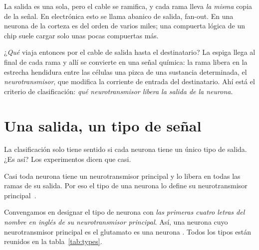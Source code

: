 La salida es una sola, pero el cable se ramifica, y cada rama lleva \emph{la misma} copia de la señal. En electrónica esto se llama abanico de salida, fan-out. En una neurona de la corteza es del orden de varios miles; una compuerta lógica de un chip suele cargar solo unas pocas compuertas más.

¿\emph{Qué} viaja entonces por el cable de salida hasta el destinatario? La espiga llega al final de cada rama y allí se convierte en una señal química: la rama libera en la estrecha hendidura entre las células una pizca de una sustancia determinada, el \emph{neurotransmisor}, que modifica la corriente de entrada del destinatario. Ahí está el criterio de clasificación: \emph{qué neurotransmisor libera la salida de la neurona}.

\section{Una salida, un tipo de señal}

La clasificación solo tiene sentido si cada neurona tiene un único tipo de salida. ¿Es así? Los experimentos dicen que casi.

\begin{keyblock}
\begin{proposition}
\label{prop:dale}
Casi toda neurona tiene un neurotransmisor principal y lo libera en todas las ramas de su salida. Por eso el tipo de una neurona lo define su neurotransmisor principal~\cite{Strata1999}.
\end{proposition}
\end{keyblock}

Convengamos en designar el tipo de neurona con \emph{las primeras cuatro letras del nombre en inglés de su neurotransmisor principal}. Así, una neurona cuyo neurotransmisor principal es el glutamato es una neurona . Todos los tipos están reunidos en la tabla~\ref{tab:types}.

